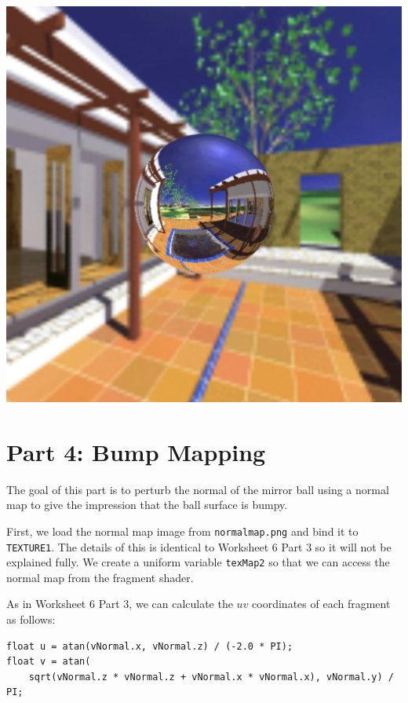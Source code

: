 \documentclass[12pt]{article}
\begin{document}
\begin{center}
\includegraphics[scale=0.39]{images/part3}
\end{center}

\newpage

\section*{Part 4: Bump Mapping}

The goal of this part is to perturb the normal of the mirror ball using a normal map to give the impression that the ball surface is bumpy.

First, we load the normal map image from \texttt{normalmap.png} and bind it to \texttt{TEXTURE1}. The details of this is identical to Worksheet 6 Part 3 so it will not be explained fully. We create a uniform variable \texttt{texMap2} so that we can access the normal map from the fragment shader.

As in Worksheet 6 Part 3, we can calculate the $uv$ coordinates of each fragment as follows:

\begin{verbatim}
float u = atan(vNormal.x, vNormal.z) / (-2.0 * PI);
float v = atan(
    sqrt(vNormal.z * vNormal.z + vNormal.x * vNormal.x), vNormal.y) / PI;
\end{verbatim}
\end{document}
